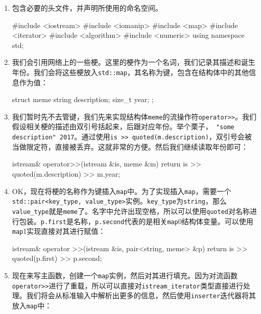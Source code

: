 \begin{enumerate}
\item 包含必要的头文件，并声明所使用的命名空间。

\begin{codebox}[cpp]
#include <iostream>
#include <iomanip>
#include <map>
#include <iterator>
#include <algorithm>
#include <numeric>
using namespace std;
\end{codebox}

\item 我们会引用网络上的一些梗。这里的梗作为一个名词，我们记录其描述和诞生年份。我们会将这些梗放入\texttt{std::map}，其名称为键，包含在结构体中的其他信息作为值：

\begin{codebox}[cpp]
struct meme {
    string description;
    size_t year;
};
\end{codebox}

\item 我们暂时先不去管键，我们先来实现结构体\texttt{meme}的流操作符\texttt{operator>>}。我们假设相关梗的描述由双引号括起来，后跟对应年份。举个栗子，\texttt{ "some description" 2017}。通过使用\texttt{is >> quoted(m.description)}，双引号会被当做限定符，直接被丢弃。这就非常的方便。然后我们继续读取年份即可：

\begin{codebox}[cpp]
istream& operator>>(istream &is, meme &m) {
    return is >> quoted(m.description) >> m.year;
}
\end{codebox}

\item OK，现在将梗的名称作为键插入\texttt{map}中。为了实现插入\texttt{map}，需要一个\texttt{std::pair<key\_type, value\_type>}实例。\texttt{key\_type}为\texttt{string}，那么\texttt{value\_type}就是\texttt{meme}了。名字中允许出现空格，所以可以使用\texttt{quoted}对名称进行包装。\texttt{p.first}是名称，\texttt{p.second}代表的是相关\texttt{map}0结构体变量。可以使用\texttt{map}1实现直接对其进行赋值：

\begin{codebox}[cpp]
istream& operator >>(istream &is,
                    pair<string, meme> &p) {
    return is >> quoted(p.first) >> p.second;
}
\end{codebox}

\item 现在来写主函数，创建一个\texttt{map}实例，然后对其进行填充。因为对流函数\texttt{operator>>}进行了重载，所以可以直接对\texttt{istream\_iterator}类型直接进行处理。我们将会从标准输入中解析出更多的信息，然后使用\texttt{inserter}迭代器将其放入\texttt{map}中：


\end{enumerate}
